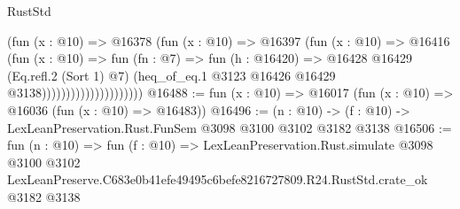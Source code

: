 \begin{lexlean}{RustStd}
\begin{coremodule}
                                    (fun (x : @10) =>
                                    @16378
                                      (fun (x : @10) =>
                                      @16397
                                        (fun (x : @10) =>
                                        @16416
                                          (fun (x : @10) =>
                                          fun (fn : @7) =>
                                          fun (h : @16420) =>
                                          @16428
                                            @16429
                                            (Eq.refl.{2} (Sort 1) @7)
                                            (heq_of_eq.{1}
                                              @3123
                                              @16426
                                              @16429
                                              @3138)))))))))))))))))))))
@16488 := fun (x : @10) => @16017 (fun (x : @10) => @16036 (fun (x : @10) => @16483))
@16496 := (n : @10) -> (f : @10) -> LexLeanPreservation.Rust.FunSem @3098 @3100 @3102 @3182 @3138
@16506 := fun (n : @10) =>
  fun (f : @10) =>
  LexLeanPreservation.Rust.simulate
    @3098
    @3100
    @3102
    LexLeanPreserve.C683e0b41efe49495c6befe8216727809.R24.RustStd.crate_ok
    @3182
    @3138
\end{coremodule}
\end{lexlean}
